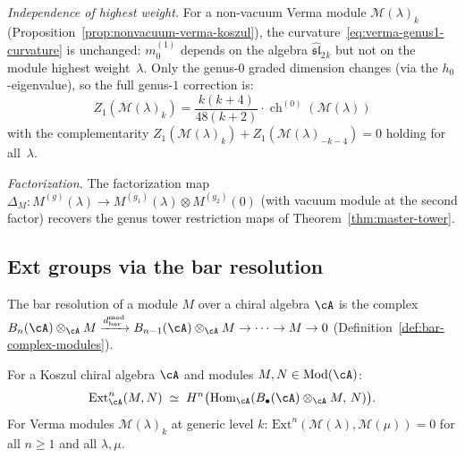 \begin{example}
\emph{Independence of highest weight.}
For a non-vacuum Verma module $\mathcal{M}(\lambda)_k$
(Proposition~\ref{prop:nonvacuum-verma-koszul}), the
curvature~\eqref{eq:verma-genus1-curvature} is unchanged:
$m_0^{(1)}$ depends on the algebra $\widehat{\mathfrak{sl}}_2{}_k$
but not on the module highest weight~$\lambda$.  Only the
genus-$0$ graded dimension changes (via the $h_0$-eigenvalue),
so the full genus-$1$ correction is:
\[
Z_1(\mathcal{M}(\lambda)_k)
= \frac{k(k+4)}{48(k+2)} \cdot \operatorname{ch}^{(0)}(\mathcal{M}(\lambda))
\]
with the complementarity
$Z_1(\mathcal{M}(\lambda)_k) + Z_1(\mathcal{M}(\lambda)_{-k-4}) = 0$
holding for all~$\lambda$.

\emph{Factorization.}
The factorization map
$\Delta_M\colon M^{(g)}(\lambda) \to
M^{(g_1)}(\lambda) \otimes M^{(g_2)}(0)$
(with vacuum module at the second factor) recovers the genus tower
restriction maps of Theorem~\ref{thm:master-tower}.
\end{example}

\subsection{Ext groups via the bar resolution}
\label{subsec:ext-bar-resolution}

The bar resolution of a module $M$ over a chiral algebra $\cA$ is
the complex
$B_n(\cA) \otimes_\cA M \xrightarrow{d^{\mathrm{mod}}_{\mathrm{bar}}}
B_{n-1}(\cA) \otimes_\cA M \to \cdots \to M \to 0$
(Definition~\ref{def:bar-complex-modules}).

\begin{proposition}
\label{prop:ext-bar-resolution}
For a Koszul chiral algebra $\cA$ and modules $M, N \in \mathrm{Mod}(\cA)$:
\begin{equation}\label{eq:ext-bar-resolution}
\mathrm{Ext}^n_\cA(M, N)
\;\simeq\;
H^n\bigl(\mathrm{Hom}_\cA(B_\bullet(\cA) \otimes_\cA M,\, N)\bigr).
\end{equation}
For Verma modules $\mathcal{M}(\lambda)_k$ at generic level $k$:
$\mathrm{Ext}^n(\mathcal{M}(\lambda), \mathcal{M}(\mu)) = 0$
for all $n \geq 1$ and all $\lambda, \mu$.
\end{proposition}

